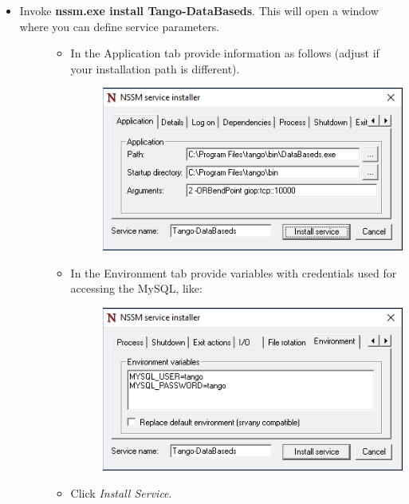 \documentclass[letterpaper,10pt,english]{sphinxmanual}
\begin{document}
\begin{itemize}
\begin{description}
\begin{itemize}
\item {} \begin{description}
\item[{Invoke \textbf{nssm.exe install Tango-DataBaseds}. This will open a window where you can define service parameters.}] \leavevmode\begin{itemize}
\item {} \begin{description}
\item[{In the Application tab provide information as follows (adjust if your installation path is different).}] \leavevmode
\includegraphics{databaseds-as-service-01.png}

\end{description}

\item {} \begin{description}
\item[{In the Environment tab provide variables with credentials used for accessing the MySQL, like:}] \leavevmode
\includegraphics{databaseds-as-service-02.png}

\end{description}

\item {} 
Click \emph{Install Service}.

\end{itemize}


\end{description}
\end{itemize}
\end{description}
\end{itemize}
\end{document}
